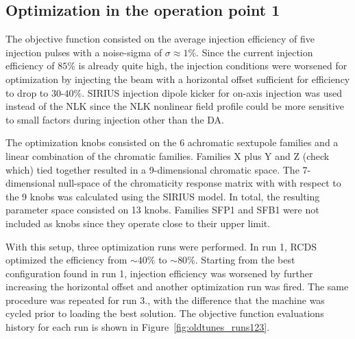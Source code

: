 \documentclass[a4paper,
               keeplastbox,   %
               ]{jacow}
\begin{document}
\subsection{Optimization in the  operation point 1}
The objective function consisted on the average injection efficiency of five injection pulses with a noise-sigma of $\sigma \approx 1\%$. Since the current injection efficiency of $85\%$ is already quite high, the injection conditions were worsened for optimization by injecting the beam with a horizontal offset sufficient for efficiency to drop to $30$-$40\%$. SIRIUS injection dipole kicker for on-axis injection was used instead of the NLK since the NLK nonlinear field profile could be more sensitive to small factors during injection other than the DA. 

The optimization knobs consisted on the 6 achromatic sextupole families and a linear combination of the chromatic families. Families X plus Y and Z  (check which) tied together resulted in a 9-dimensional chromatic space. The 7-dimensional null-space of the chromaticity response matrix with with respect to the 9 knobs was calculated using the SIRIUS model. In total, the resulting parameter space consisted on 13 knobs. Families SFP1 and SFB1 were not included as knobs since they operate close to their upper limit.

With this setup, three optimization runs were performed. In run 1, RCDS optimized the efficiency from $\sim 40\%$ to $\sim 80\%$. Starting from the best configuration found in run 1, injection efficiency was worsened by further increasing the horizontal offset and another optimization run was fired. The same procedure was repeated for run 3., with the difference that the machine was cycled prior to loading the best solution. The objective function evaluations history for each run is shown in Figure~\ref{fig:oldtunes_runs123}.
\end{document}
